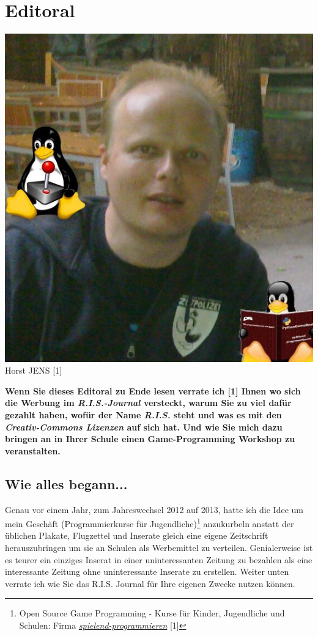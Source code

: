 \section*{Editoral} 
\label{editoral}

\begin{center}
\includegraphics[width=0.8\linewidth]{editoral/horst2011mitdoppeltux.jpg}\\ 
\footnotesize{Horst JENS [1]}
\end{center}   
\textbf{Wenn Sie dieses Editoral zu Ende lesen verrate ich [1] Ihnen wo sich die Werbung im \textit{R.I.S.-Journal} versteckt, warum Sie zu viel daf\"ur gezahlt haben, wof\"ur der Name \textit{R.I.S.} steht und was es mit den \textit{Creativ-Commons Lizenzen} auf sich hat. Und wie Sie mich dazu bringen an in Ihrer Schule einen Game-Programming Workshop zu veranstalten.} 


\subsection*{Wie alles begann...}
Genau vor einem Jahr, zum Jahreswechsel 2012 auf 2013, hatte ich die Idee um mein Geschäft (Programmierkurse für Jugendliche)\footnote{Open Source Game Programming - Kurse für Kinder, Jugendliche und Schulen: Firma \href{http://spielend-programmieren.at}{\textit{spielend-programmieren}} [1]} anzukurbeln anstatt der üblichen Plakate, Flugzettel und Inserate gleich eine eigene Zeitschrift herauszubringen um sie an Schulen als Werbemittel zu verteilen. Genialerweise ist es teurer ein einziges Inserat in einer uninteressanten Zeitung zu bezahlen als eine interessante Zeitung ohne uninteressante Inserate zu erstellen. Weiter unten verrate ich wie Sie das R.I.S. Journal für Ihre eigenen Zwecke nutzen können.

